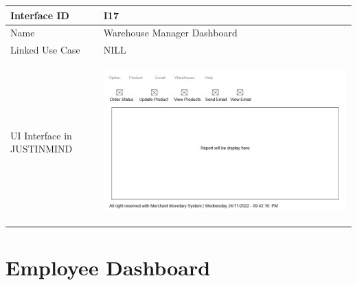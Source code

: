 \documentclass[12pt,a4paper]{report}
\begin{document}
\begin{tabular}{ | m{3cm} | m{12cm}| } \hline

Interface ID &  I17 \\\hline

Name  &  Warehouse Manager Dashboard \\ \hline

Linked Use Case & NILL \\ \hline

UI Interface in JUSTINMIND & \begin{center} \includegraphics[scale=0.3]{./UIs for Latex Reports/UI-017 Warehouse Manager Dashboard@1x.png}\end{center}  \\ \hline


\end{tabular} 
\section{Employee Dashboard }
\end{document}
